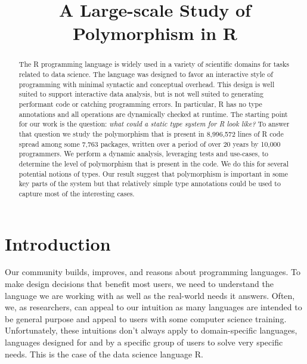\documentclass[acmsmall,10pt,review,anonymous]{acmart}\settopmatter{printfolios=true,printccs=false,printacmref=false}
\begin{document}
\title{A Large-scale Study of Polymorphism in R}

\newcommand{\PACKAGES}{7,763\xspace}
\newcommand{\PROGRAMMERS}{10,000\xspace}
\newcommand{\PERCENTCRAN}{56\%\xspace}
\newcommand{\CRANTOTAL}{13,841\xspace}
\newcommand{\RLOC}{8,996,572\xspace}
\newcommand{\CLOC}{5,100,719\xspace}
\newcommand{\YEARS}{20\xspace}

\begin{abstract}
The R programming language is widely used in a variety of scientific domains
for tasks related to data science. The language was designed to favor an
interactive style of programming with minimal syntactic and conceptual
overhead. This design is well suited to support interactive data analysis,
but is not well suited to generating performant code or catching programming
errors.  In particular, R has no type annotations and all operations are
dynamically checked at runtime. The starting point for our work is the
question: \emph{what could a static type system for R look like?}  To answer
that question we study the polymorphism that is present in \RLOC lines of R 
code spread among some \PACKAGES packages, written over a
period of over \YEARS years by \PROGRAMMERS programmers.  We perform a dynamic
analysis, leveraging tests and use-cases, to determine the level of
polymorphism that is present in the code. We do this for several potential
notions of types. Our result suggest that polymorphism is important in some
key parts of the system but that relatively simple type annotations could be
used to capture most of the interesting cases.
\end{abstract}

\maketitle

\section{Introduction}

Our community builds, improves, and reasons about programming languages.  To
make design decisions that benefit most users, we need to understand the
language we are working with as well as the real-world needs it
answers. Often, we, as researchers, can appeal to our intuition as many
languages are intended to be general purpose and appeal to users with some
computer science training. Unfortunately, these intuitions don't always
apply to domain-specific languages, languages designed for and by a specific
group of users to solve very specific needs. This is the case of the data
science language R.
\end{document}
